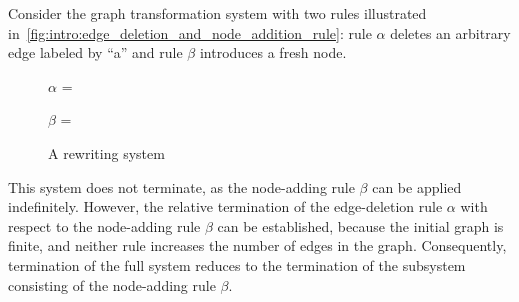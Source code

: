 Consider the graph transformation system with two rules illustrated in~\autoref{fig:intro:edge_deletion_and_node_addition_rule}: rule $\alpha$ deletes an arbitrary edge labeled by \enquote{a} and rule $\beta$ introduces a fresh node.
  \begin{figure}[!htbp]
        \centering
        $\alpha$ = {
                    }
    

        $\beta$ ={
                    }
    \caption{A rewriting system}
    \label{fig:intro:edge_deletion_and_node_addition_rule}
  \end{figure}
  This system does not terminate, as the node-adding rule $\beta$ can be applied indefinitely. However, the relative termination of the edge-deletion rule $\alpha$ with respect to the node-adding rule $\beta$ can be established, because the initial graph is finite, and neither rule increases the number of edges in the graph.
   Consequently, termination of the full system reduces to the termination of the subsystem consisting of the node-adding rule $\beta$.

